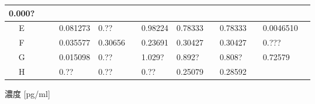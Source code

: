 \documentclass[UTF8,10pt,a4paper,fontset=fandol]{ctexart}
\newcommand{\fieldvalue}[1]{#1}
\begin{document}
\begin{center}
\begin{tabular}{c|p{0.52cm}|p{0.52cm}|p{1.02cm}|p{1.02cm}|p{0.52cm}|p{1.02cm}|p{1.02cm}|p{0.52cm}|p{1.02cm}|p{0.52cm}|p{1.02cm}|p{0.52cm}}
\fieldvalue{\scriptsize 0.000?} &\\ \hline
E & & &
\fieldvalue{\scriptsize 0.081273} &
\fieldvalue{\scriptsize 0.??} &
&
\fieldvalue{\scriptsize 0.98224} &
\fieldvalue{\scriptsize 0.78333} &
&
\fieldvalue{\scriptsize 0.78333} &
&
\fieldvalue{\scriptsize 0.0046510} &\\ \hline
F & & &
\fieldvalue{\scriptsize 0.035577} &
\fieldvalue{\scriptsize 0.30656} &
&
\fieldvalue{\scriptsize 0.23691} &
\fieldvalue{\scriptsize 0.30427} &
&
\fieldvalue{\scriptsize 0.30427} &
&
\fieldvalue{\scriptsize 0.???} &\\ \hline
G & & &
\fieldvalue{\scriptsize 0.015098} &
\fieldvalue{\scriptsize 0.??} &
&
\fieldvalue{\scriptsize 1.029?} &
\fieldvalue{\scriptsize 0.892?} &
&
\fieldvalue{\scriptsize 0.808?} &
&
\fieldvalue{\scriptsize 0.72579} &\\ \hline
H & & &
\fieldvalue{\scriptsize 0.??} &
\fieldvalue{\scriptsize 0.??} &
&
\fieldvalue{\scriptsize 0.??} &
\fieldvalue{\scriptsize 0.25079} &
&
\fieldvalue{\scriptsize 0.28592} &
& &
\end{tabular}
\end{center}

\medskip

\noindent 濃度 [pg/ml]
\end{document}
